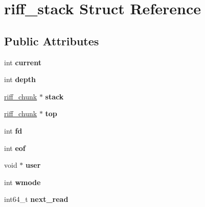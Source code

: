\hypertarget{structriff__stack}{\section{riff\-\_\-stack Struct Reference}
\label{structriff__stack}
}
\subsection*{Public Attributes}
\begin{DoxyCompactItemize}
\item 
\hypertarget{structriff__stack_a40651781baad6c543c4b37de65fb99be}{int {\bfseries current}}\label{structriff__stack_a40651781baad6c543c4b37de65fb99be}

\item 
\hypertarget{structriff__stack_aed3b95609efb819a3b6c3c621fb1c894}{int {\bfseries depth}}\label{structriff__stack_aed3b95609efb819a3b6c3c621fb1c894}

\item 
\hypertarget{structriff__stack_a42de4c125b40b5940df3cf6526cd0e54}{\hyperlink{structriff__chunk}{riff\-\_\-chunk} $\ast$ {\bfseries stack}}\label{structriff__stack_a42de4c125b40b5940df3cf6526cd0e54}

\item 
\hypertarget{structriff__stack_acb7103748721a4d4bbc86d7b73a3619d}{\hyperlink{structriff__chunk}{riff\-\_\-chunk} $\ast$ {\bfseries top}}\label{structriff__stack_acb7103748721a4d4bbc86d7b73a3619d}

\item 
\hypertarget{structriff__stack_a55140429933e0a862df81d4c50365f1b}{int {\bfseries fd}}\label{structriff__stack_a55140429933e0a862df81d4c50365f1b}

\item 
\hypertarget{structriff__stack_a55c28a4b72905aebe02d947c2297b38d}{int {\bfseries eof}}\label{structriff__stack_a55c28a4b72905aebe02d947c2297b38d}

\item 
\hypertarget{structriff__stack_abfaa3b384885bd02d2d8abc787841752}{void $\ast$ {\bfseries user}}\label{structriff__stack_abfaa3b384885bd02d2d8abc787841752}

\item 
\hypertarget{structriff__stack_affe8344f682e9088cf6f96f174137cec}{int {\bfseries wmode}}\label{structriff__stack_affe8344f682e9088cf6f96f174137cec}

\item 
\hypertarget{structriff__stack_ab557fe9b6e358e0c2cec9b5917e1f8ca}{int64\-\_\-t {\bfseries next\-\_\-read}}\label{structriff__stack_ab557fe9b6e358e0c2cec9b5917e1f8ca}


\end{DoxyCompactItemize}
